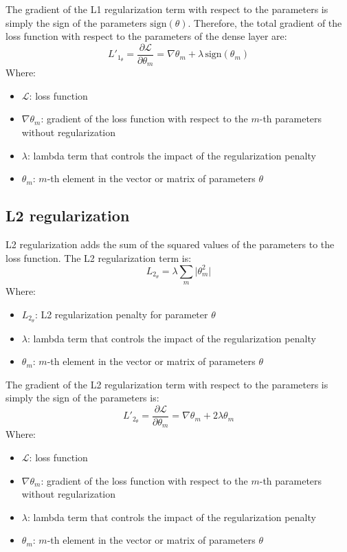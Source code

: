 \documentclass[a4paper]{report}
\newcommand{\abs}[1]{\lvert#1\rvert}
\newcommand{\ELL}{\mathcal{L}}
\begin{document}
The gradient of the L1 regularization term with respect to the parameters is simply the sign of the parameters $\text{sign}(\theta)$. Therefore, the total gradient of the loss function with respect to the parameters of the dense layer are:
\begin{equation*}
    L'_{1_\theta} = \frac{\partial\ELL}{\partial \theta_m} = \nabla\theta_m + \lambda\,\text{sign}(\theta_m)
\end{equation*}
Where:
\begin{itemize}
    \item $\ELL$: loss function
    \item $\nabla\theta_m$: gradient of the loss function with respect to the $m$-th parameters without regularization
    \item $\lambda$: lambda term that controls the impact of the regularization penalty
    \item $\theta_m$: $m$-th element in the vector or matrix of parameters $\theta$
\end{itemize}

\subsection{L2 regularization}
L2 regularization adds the sum of the squared values of the parameters to the loss function. The L2 regularization term is:
\begin{equation*}
    L_{2_\theta} = \lambda \sum_m \abs{\theta_m^2}
\end{equation*}
Where:
\begin{itemize}
    \item $L_{2_\theta}$: L2 regularization penalty for parameter $\theta$
    \item $\lambda$: lambda term that controls the impact of the regularization penalty
    \item $\theta_m$: $m$-th element in the vector or matrix of parameters $\theta$
\end{itemize}

The gradient of the L2 regularization term with respect to the parameters is simply the sign of the parameters is: 
\begin{equation*}
    L'_{2_\theta} = \frac{\partial\ELL}{\partial \theta_m} = \nabla\theta_m + 2\lambda\theta_m
\end{equation*}
Where:
\begin{itemize}
    \item $\ELL$: loss function
    \item $\nabla\theta_m$: gradient of the loss function with respect to the $m$-th parameters without regularization
    \item $\lambda$: lambda term that controls the impact of the regularization penalty
    \item $\theta_m$: $m$-th element in the vector or matrix of parameters $\theta$
\end{itemize}
\end{document}
